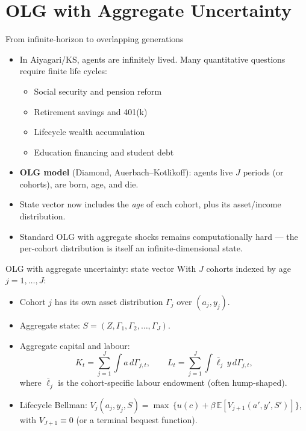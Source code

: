 \section{OLG with Aggregate Uncertainty}

\begin{frame}{From infinite-horizon to overlapping generations}
\begin{itemize}
\item In Aiyagari/KS, agents are infinitely lived. Many quantitative questions require finite life cycles:
  \begin{itemize}
  \item Social security and pension reform
  \item Retirement savings and 401(k)
  \item Lifecycle wealth accumulation
  \item Education financing and student debt
  \end{itemize}
\medskip
\item \textbf{OLG model} (Diamond, Auerbach--Kotlikoff): agents live $J$ periods (or cohorts), are born, age, and die.
\medskip
\item State vector now includes the \emph{age} of each cohort, plus its asset/income distribution.
\medskip
\item Standard OLG with aggregate shocks remains computationally hard --- the per-cohort distribution is itself an infinite-dimensional state.
\end{itemize}
\end{frame}

\begin{frame}{OLG with aggregate uncertainty: state vector}
With $J$ cohorts indexed by age $j = 1, \ldots, J$:
\medskip
\begin{itemize}
\item Cohort $j$ has its own asset distribution $\Gamma_j$ over $(a_j, y_j)$.
\medskip
\item Aggregate state: $S = (Z, \Gamma_1, \Gamma_2, \ldots, \Gamma_J)$.
\medskip
\item Aggregate capital and labour:
\[
K_t = \sum_{j=1}^{J} \int a\,d\Gamma_{j,t}, \qquad
L_t = \sum_{j=1}^{J} \int \bar\ell_j\, y\, d\Gamma_{j,t},
\]
where $\bar\ell_j$ is the cohort-specific labour endowment (often hump-shaped).
\medskip
\item Lifecycle Bellman: $V_j(a_j, y_j, S) = \max\,\{u(c) + \beta\, \mathbb{E}[V_{j+1}(a',y',S')]\}$, with $V_{J+1}\equiv 0$ (or a terminal bequest function).
\end{itemize}
\end{frame}

